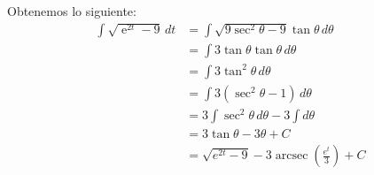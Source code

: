\documentclass[a4paper,10pt]{article}
\newcommand{\dis}{\displaystyle}
\def\e{\operatorname{e}}
\DeclareMathOperator{\arcsec}{arcsec}
\begin{document}
\begin{enumerate}
\begin{enumerate}[label=\emph{\alph*)}]
\begin{minipage}{.3\textwidth}
\end{minipage}

\dotfill [1 punto]

Obtenemos lo siguiente:
\begin{align*}
 \dis \int \sqrt{\e^{2t}-9} \, dt &=    \dis \int \sqrt{9 \sec^2 \theta - 9} \tan \theta\, d\theta\\
 									&=    \dis \int 3\tan \theta \tan \theta\, d\theta\\
                                    &=    \dis \int 3\tan^2 \theta \, d\theta\\
                                    &=    \dis \int 3(\sec^2 \theta-1)  \, d\theta\\
                                    &=    \dis 3\int \sec^2 \theta  \, d\theta - 3\int  d\theta\\
                                    &=    \dis 3 \tan \theta - 3\theta + C\\
                                    &=    \dis \sqrt{e^{2t}-9} - 3\arcsec \left(\frac{e^t}{3}\right) + C\\
\end{align*}

\dotfill [1 punto]

\end{enumerate}


\end{enumerate}

\vspace{10mm}
\end{document}
